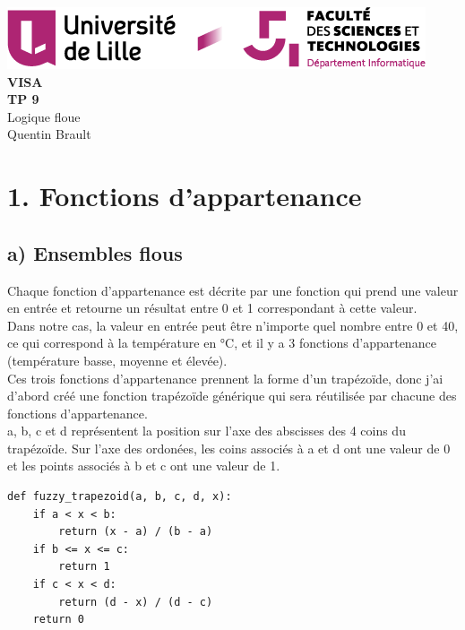 \documentclass[11pt]{report}
\begin{document}
\begin{titlepage}
	\centering
	\includegraphics[scale=0.8]{logo}\\
	\vspace{5cm}
	{\Huge{ \bf{VISA}}}\\
	\vspace{0.5cm}
   	{\Huge{\bf {TP 9}}}\\
	\vspace{2cm}
   	{\huge{Logique floue}}\\
	\vspace{3cm}
   	{\large{Quentin Brault}}
\end{titlepage}

\listoftodos
\section*{1. Fonctions d'appartenance}

\subsection*{a) Ensembles flous}
Chaque fonction d'appartenance est décrite par une fonction qui prend une valeur en entrée et retourne un résultat entre 0 et 1 correspondant à cette valeur.\\
Dans notre cas, la valeur en entrée peut être n'importe quel nombre entre 0 et 40, ce qui correspond à la température en °C, et il y a 3 fonctions d'appartenance (température basse, moyenne et élevée).\\
Ces trois fonctions d'appartenance prennent la forme d'un trapézoïde, donc j'ai d'abord créé une fonction trapézoïde générique qui sera réutilisée par chacune des fonctions d'appartenance.\\
a, b, c et d représentent la position sur l'axe des abscisses des 4 coins du trapézoïde. Sur l'axe des ordonées, les coins associés à a et d ont une valeur de 0 et les points associés à b et c ont une valeur de 1.
\begin{verbatim}
def fuzzy_trapezoid(a, b, c, d, x):
    if a < x < b:
        return (x - a) / (b - a)
    if b <= x <= c:
        return 1
    if c < x < d:
        return (d - x) / (d - c)
    return 0
\end{verbatim}
\end{document}
